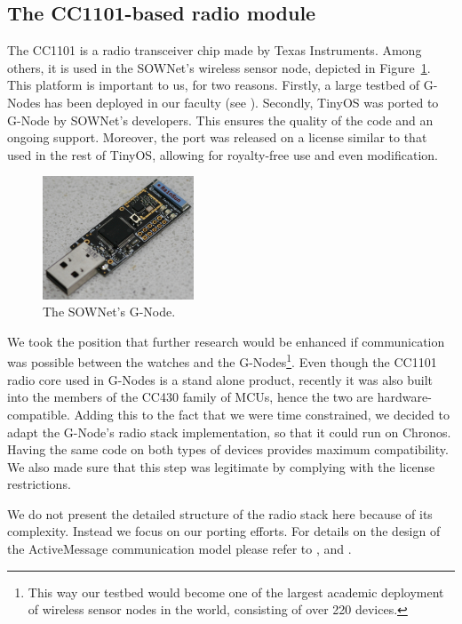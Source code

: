 \subsection{The CC1101-based radio module}

The CC1101 is a radio transceiver chip made by Texas Instruments. Among others, it is used in the SOWNet's \cite{G-Node} wireless sensor node, depicted in Figure~\ref{fig:gnode}. This platform is important to us, for two reasons. Firstly, a large testbed of G-Nodes has been deployed in our faculty (see \cite{SensorNet}). Secondly, TinyOS was ported to G-Node by SOWNet's developers. This ensures the quality of the code and an ongoing support. Moreover, the port was released on a license similar to that used in the rest of TinyOS, allowing for royalty-free use and even modification.

\begin{figure}[h]
  \centering
  \includegraphics[width=0.4\textwidth]{img/gnode.jpg}
  \caption{The SOWNet's G-Node.}
  \label{fig:gnode}
\end{figure}
We took the position that further research would be enhanced if communication was possible between the watches and the G-Nodes\footnote{This way our testbed would become one of the largest academic deployment of wireless sensor nodes in the world, consisting of over 220 devices.}. Even though the CC1101 radio core used in G-Nodes is a stand alone product, recently it was also built into the members of the CC430 family of MCUs, hence the two are hardware-compatible. Adding this to the fact that we were time constrained, we decided to adapt the G-Node's radio stack implementation, so that it could run on Chronos. Having the same code on both types of devices provides maximum compatibility. We also made sure that this step was legitimate by complying with the license restrictions.

We do not present the detailed structure of the radio stack here because of its complexity. Instead we focus on our porting efforts. For details on the design of the ActiveMessage communication model please refer to \cite{BHC}, \cite{TEP116} and \cite{TEP126}.

